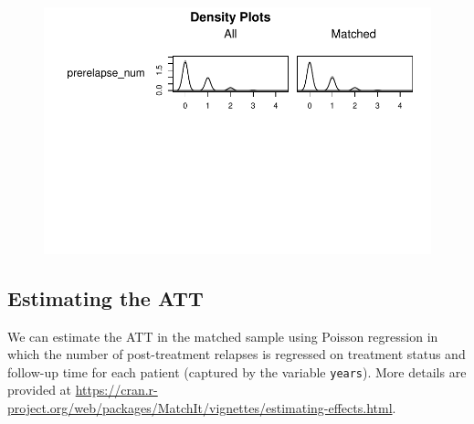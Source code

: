 \documentclass[
  letterpaper,
  DIV=11,
  numbers=noendperiod]{scrreprt}
\begin{document}
\begin{figure}[H]

{\centering \includegraphics{chapter_06_files/figure-pdf/unnamed-chunk-12-3.pdf}

}

\end{figure}

\hypertarget{estimating-the-att}{%
\subsection{Estimating the ATT}\label{estimating-the-att}}

We can estimate the ATT in the matched sample using Poisson regression
in which the number of post-treatment relapses is regressed on treatment
status and follow-up time for each patient (captured by the variable
\texttt{years}). More details are provided at
\url{https://cran.r-project.org/web/packages/MatchIt/vignettes/estimating-effects.html}.
\end{document}
